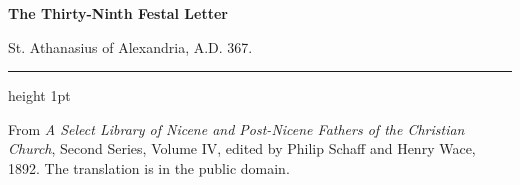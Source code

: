 \documentclass[11pt,letterpaper]{article}
\begin{document}
\color{ink}

\begin{center}
{\LARGE\bfseries\color{heading} The Thirty-Ninth Festal Letter\par}
\vspace{1.2em}
{\large St. Athanasius of Alexandria, A.D. 367.\par}
\vspace{0.4em}
{\color{accent}\hrule height 1pt}
\end{center}
\vspace{1em}



\vspace{2em}
{\small\noindent From \emph{A Select Library of Nicene and Post-Nicene Fathers of the
Christian Church}, Second Series, Volume IV, edited by Philip Schaff and
Henry Wace, 1892. The translation is in the public domain.\par}
\end{document}
